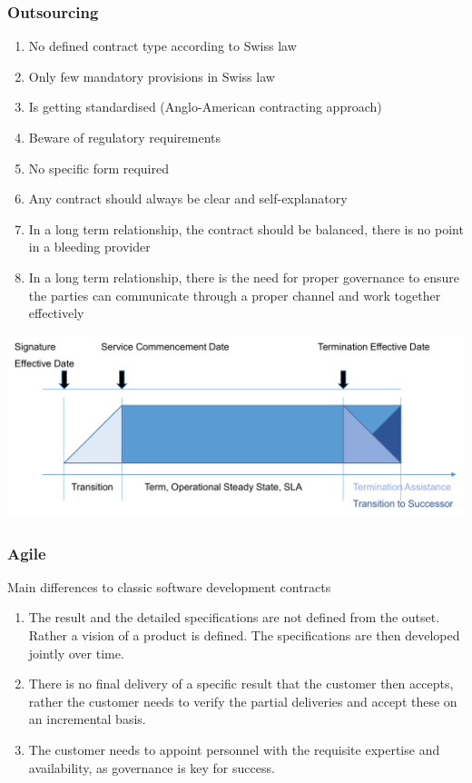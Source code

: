 \documentclass[11pt]{article}
\theoremstyle{definition}
\begin{document}
\subsubsection{Outsourcing}
\begin{enumerate}
	\item No defined contract type according to Swiss law
	\item Only few mandatory provisions in Swiss law
	\item Is getting standardised (Anglo-American contracting approach)
	\item Beware of regulatory requirements
	\item No specific form required
	\item Any contract should always be clear and self-explanatory
	\item In a long term relationship, the contract should be balanced, there is no point in a bleeding provider
	\item In a long term relationship, there is the need for proper governance to ensure the parties can communicate through a proper channel and work together effectively
\end{enumerate}
\begin{center}
	\includegraphics[width=\linewidth]{img/outsourcing_state}
\end{center}

\subsubsection{Agile}
Main differences to classic software development contracts
\begin{enumerate}
	\item The result and the detailed specifications are not defined from the outset. Rather a vision of a product is defined. The specifications are then developed jointly over time.
	\item There is no final delivery of a specific result that the customer then accepts, rather the customer needs to verify the partial deliveries and accept these on an incremental basis.
	\item The customer needs to appoint personnel with the requisite expertise and availability, as governance is key for success.
\end{enumerate}
\end{document}
